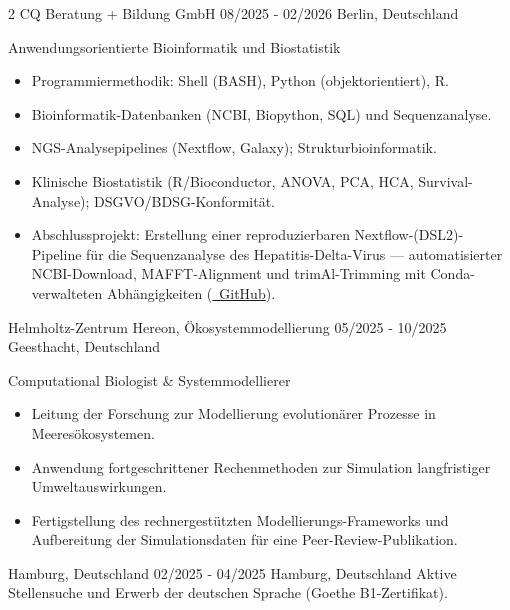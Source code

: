 \documentclass{thejus_cv}
\begin{document}
\begin{paracol}{2}
             {CQ Beratung + Bildung GmbH}
             {08/2025 - 02/2026}
             {Berlin, Deutschland}
             {Anwendungsorientierte Bioinformatik und Biostatistik
             \begin{itemize}\setlength{\itemsep}{0.05em}
                 \item Programmiermethodik: Shell (BASH), Python (objektorientiert), R.
                 \item Bioinformatik-Datenbanken (NCBI, Biopython, SQL) und Sequenzanalyse.
                 \item NGS-Analysepipelines (Nextflow, Galaxy); Strukturbioinformatik.
                 \item Klinische Biostatistik (R/Bioconductor, ANOVA, PCA, HCA, Survival-Analyse); DSGVO/BDSG-Konformit\"at.
                 \item Abschlussprojekt: Erstellung einer reproduzierbaren Nextflow-(DSL2)-Pipeline f\"ur die Sequenzanalyse des Hepatitis-Delta-Virus --- automatisierter NCBI-Download, MAFFT-Alignment und trimAl-Trimming mit Conda-verwalteten Abh\"angigkeiten (\href{https://github.com/thejusmahajan/hepatitis-delta-pipeline}{\faGithub\ GitHub}).
             \end{itemize}}

             {Helmholtz-Zentrum Hereon, \"Okosystemmodellierung}
             {05/2025 - 10/2025}
             {Geesthacht, Deutschland}
             {Computational Biologist \& Systemmodellierer
             \begin{itemize}
                 \item Leitung der Forschung zur Modellierung evolution\"arer Prozesse in Meeresökosystemen.
                 \item Anwendung fortgeschrittener Rechenmethoden zur Simulation langfristiger Umweltauswirkungen.
                 \item Fertigstellung des rechnergest\"utzten Modellierungs-Frameworks und Aufbereitung der Simulationsdaten f\"ur eine Peer-Review-Publikation.
             \end{itemize}}

             {Hamburg, Deutschland}
             {02/2025 - 04/2025}
             {Hamburg, Deutschland}
             {Aktive Stellensuche und Erwerb der deutschen Sprache (Goethe B1-Zertifikat).}


\end{paracol}
\end{document}
